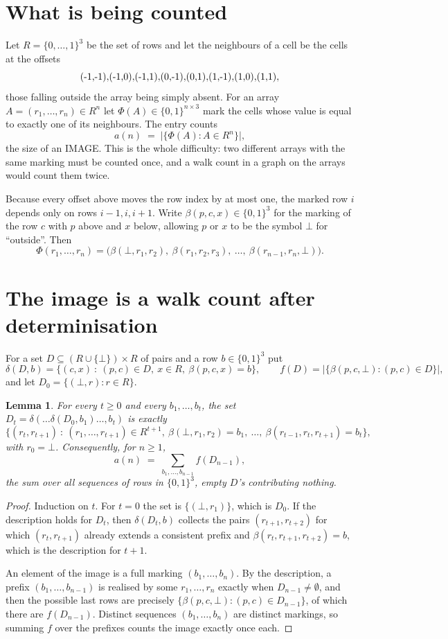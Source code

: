 \documentclass[11pt,a4paper]{article}
\theoremstyle{plain}
\newtheorem{lemma}[theorem]{Lemma}
\theoremstyle{definition}
\begin{document}
\section{What is being counted}

Let $R=\{0,\dots,1\}^{3}$ be the set of rows and let the neighbours of a cell be the
cells at the offsets
\[
$(-1,-1)$, $(-1,0)$, $(-1,1)$, $(0,-1)$, $(0,1)$, $(1,-1)$, $(1,0)$, $(1,1)$,
\]
those falling outside the array being simply absent. For an array
$A=(r_1,\dots,r_n)\in R^n$ let $\Phi(A)\in\{0,1\}^{n\times3}$ mark the cells whose value
is equal to exactly one of its neighbours. The entry counts
\[
a(n)\;=\;\bigl|\{\Phi(A):A\in R^n\}\bigr| ,
\]
the size of an IMAGE. This is the whole difficulty: two different arrays with the same marking
must be counted once, and a walk count in a graph on the arrays would count them twice.

Because every offset above moves the row index by at most one, the marked row $i$ depends only
on rows $i-1,i,i+1$. Write $\beta(p,c,x)\in\{0,1\}^{3}$ for the marking of the row $c$
with $p$ above and $x$ below, allowing $p$ or $x$ to be the symbol $\bot$ for ``outside''.
Then
\[
\Phi(r_1,\dots,r_n)=\bigl(\beta(\bot,r_1,r_2),\ \beta(r_1,r_2,r_3),\ \dots,\
\beta(r_{n-1},r_n,\bot)\bigr).
\]

\section{The image is a walk count after determinisation}

For a set $D\subseteq(R\cup\{\bot\})\times R$ of pairs and a row $b\in\{0,1\}^{3}$ put
\[
\delta(D,b)=\{(c,x)\ :\ (p,c)\in D,\ x\in R,\ \beta(p,c,x)=b\},\qquad
f(D)=\bigl|\{\beta(p,c,\bot):(p,c)\in D\}\bigr| ,
\]
and let $D_0=\{(\bot,r):r\in R\}$.

\begin{lemma}\label{lem:det}
For every $t\ge0$ and every $b_1,\dots,b_t$, the set
$D_t=\delta(\dots\delta(D_0,b_1)\dots,b_t)$ is exactly
\[
\{(r_t,r_{t+1})\ :\ (r_1,\dots,r_{t+1})\in R^{t+1},\ \beta(\bot,r_1,r_2)=b_1,\ \dots,\
\beta(r_{t-1},r_t,r_{t+1})=b_t\} ,
\]
with $r_0=\bot$. Consequently, for $n\ge1$,
\[
a(n)\;=\;\sum_{b_1,\dots,b_{n-1}}f(D_{n-1}),
\]
the sum over all sequences of rows in $\{0,1\}^{3}$, empty $D$'s contributing nothing.
\end{lemma}

\begin{proof}
Induction on $t$. For $t=0$ the set is $\{(\bot,r_1)\}$, which is $D_0$. If the description
holds for $D_t$, then $\delta(D_t,b)$ collects the pairs $(r_{t+1},r_{t+2})$ for which
$(r_t,r_{t+1})$ already extends a consistent prefix and
$\beta(r_t,r_{t+1},r_{t+2})=b$, which is the description for $t+1$.

An element of the image is a full marking $(b_1,\dots,b_n)$. By the description, a prefix
$(b_1,\dots,b_{n-1})$ is realised by some $r_1,\dots,r_n$ exactly when $D_{n-1}\neq
\emptyset$, and then the possible last rows are precisely
$\{\beta(p,c,\bot):(p,c)\in D_{n-1}\}$, of which there are $f(D_{n-1})$. Distinct
sequences $(b_1,\dots,b_n)$ are distinct markings, so summing $f$ over the prefixes counts the
image exactly once each.
\end{proof}
\end{document}
